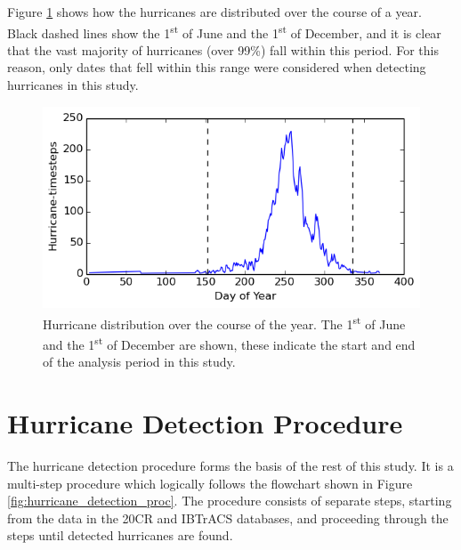 \documentclass[pdftex,12pt,a4paper]{report}
\newcommand{\ts}{\textsuperscript}
\begin{document}
\newpage
Figure \ref{fig:yearly_hurr_dist} shows how the hurricanes are distributed over the course of a
year. Black dashed lines show the 1\ts{st} of June and the 1\ts{st} of December, and it is clear
that the vast majority of hurricanes (over 99\%) fall within this period. For this reason, only
dates that fell within this range were considered when detecting hurricanes in this study.

\begin{figure}[hb!]
    \centering
    \includegraphics[width=\textwidth]{figures/yearly_hurr_dist}
    \caption{Hurricane distribution over the course of the year. The 1\ts{st} of June and the
    1\ts{st} of December are shown, these indicate the start and end of the analysis period in this
    study. }
    \label{fig:yearly_hurr_dist}
\end{figure}

\chapter{Hurricane Detection Procedure}
\label{chap:hurricane_detection_proc}


The hurricane detection procedure forms the basis of the rest of this study. It is a multi-step
procedure which logically follows the flowchart shown in Figure \ref{fig:hurricane_detection_proc}.
The procedure consists of separate steps, starting from the data in the 20CR and IBTrACS
databases, and proceeding through the steps until detected hurricanes are found. 
\end{document}
